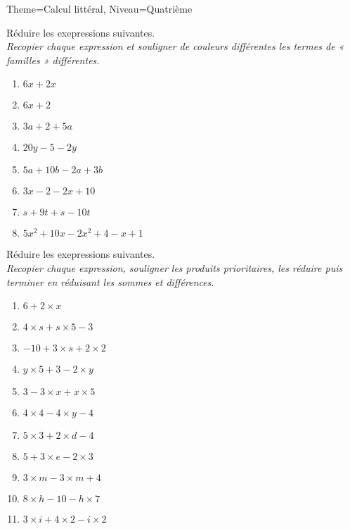 \documentclass[11pt]{article}
\begin{document}
\begin{multicols}{2}
\begin{Maquette}[Fiche]{Theme=Calcul littéral, Niveau=Quatrième}
\begin{exercice}
    Réduire les exepressions suivantes.\\
    \emph{Recopier chaque expression et souligner de couleurs différentes les termes de « familles » différentes.}
    \begin{enumerate}[label=\textbf{\alph*.}]
        \item $6x + 2x$
        \item $6x + 2$
        \item $3a + 2 + 5a$
        \item $20y - 5 -2y$
        \item $5a + 10b - 2a + 3b$
        \item $3x -2 -2x + 10$
        \item $s + 9t + s - 10t$
        \item $5x^2 + 10x - 2x^2 + 4 - x + 1$
    \end{enumerate}
\end{exercice}

\begin{exercice}
    Réduire les exepressions suivantes.\\
    \emph{Recopier chaque expression, souligner les produits prioritaires, les réduire puis terminer en réduisant les sommes et différences.}
    \begin{enumerate}[label=\textbf{\alph*.}]
        \item $6 + 2 \times x$
        \item $4 \times s + s \times 5 - 3$
        \item $-10 + 3 \times s + 2 \times 2$
        \item $y \times 5 + 3 - 2 \times y$
        \item $3 - 3 \times x + x \times 5$
        \item $4 \times 4 - 4 \times y - 4$
        \item $5 \times 3 + 2 \times d - 4$
        \item $5 + 3 \times e - 2 \times 3$
        \item $3 \times m - 3 \times m + 4$
        \item $8 \times h - 10 - h \times 7$
        \item $3 \times i + 4 \times 2 - i \times 2$
    \end{enumerate}
\end{exercice}

\end{Maquette}

\end{multicols}
\end{document}
